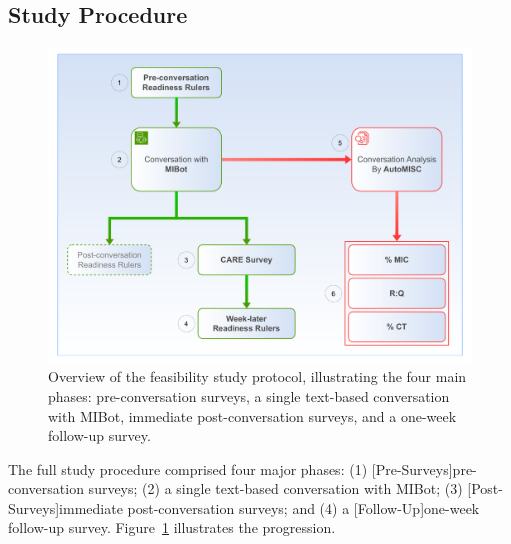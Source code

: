 \subsection{Study Procedure}
\begin{figure}[ht]
    \centering
    \includegraphics[width=0.9\linewidth]{fig/feasibility_study_flow.pdf}
    \caption[Feasibility Study Protocol Overview]{Overview of the feasibility study protocol, illustrating the four main phases: pre-conversation surveys, a single text-based conversation with MIBot, immediate post-conversation surveys, and a one-week follow-up survey.}
    \label{fig:study-flow}
\end{figure}

The full study procedure comprised four major phases: (1) [Pre-Surveys]pre-conversation surveys; (2) a single text-based conversation with MIBot; (3) [Post-Surveys]immediate post-conversation surveys; and (4) a [Follow-Up]one-week follow-up survey. Figure~\ref{fig:study-flow} illustrates the progression.



